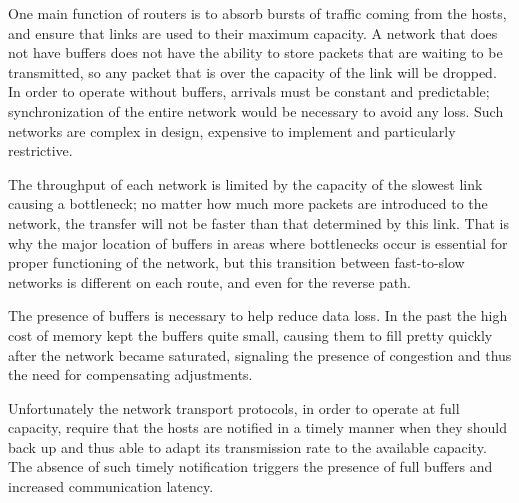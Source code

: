 One main function of routers is to absorb bursts of traffic coming from the
hosts, and ensure that links are used to their maximum capacity. A network
that does not have buffers does not have the ability to store packets that are
waiting to be transmitted, so any packet that is over the capacity of the
link will be dropped. In order to operate without buffers, arrivals must be
constant and predictable; synchronization of the entire network would be
necessary to avoid any loss. Such networks are complex in design, expensive to
implement and particularly restrictive.

The throughput of each network is limited by the capacity of the slowest link
causing a bottleneck; no matter how much more packets are introduced to the
network, the transfer will not be faster than that determined by this link.
That is why the major location of buffers in areas where bottlenecks occur is
essential for proper functioning of the network, but this transition between
fast-to-slow networks is different on each route, and even for the reverse path.

The presence of buffers is necessary to help reduce data loss. In the past the high cost of memory kept the buffers quite small, causing them
to fill pretty quickly after the network became saturated, signaling the presence of congestion and thus the need for
compensating adjustments.

Unfortunately the network transport protocols, in order to operate at full
capacity, require that the hosts are notified in a timely manner when they
should back up and thus able to adapt its transmission rate to the available
capacity. The absence of such timely notification triggers the presence of
full buffers and increased communication latency.
